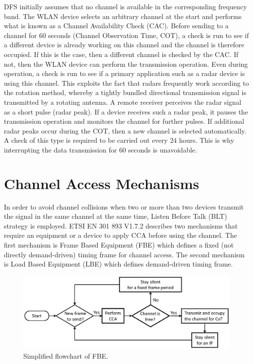DFS initially assumes that no channel is available in the corresponding frequency band. The WLAN device selects an arbitrary channel at the start and performs what is known as a Channel Availability Check (CAC). Before sending to a channel for $60$ seconds (Channel Observation Time, COT), a check is run to see if a different device is already working on this channel and the channel is therefore occupied. If this is the case, then a different channel is checked by the CAC. If not, then the WLAN device can perform the transmission operation. Even during operation, a check is run to see if a primary application such as a radar device is using this channel. This exploits the fact that radars frequently work according to the rotation method, whereby a tightly bundled directional transmission signal is transmitted by a rotating antenna. A remote receiver perceives the radar signal as a short pulse (radar peak). If a device receives such a radar peak, it pauses the transmission operation and monitors the channel for further pulses. If additional radar peaks occur during the COT, then a new channel is selected automatically. A check of this type is required to be carried out every $24$ hours. This is why interrupting the data transmission for $60$ seconds is unavoidable. 


\section{Channel Access Mechanisms}
\label{subsec:ETSI-overview}

In order to avoid channel collisions when two or more than two devices transmit the signal in the same channel at the same time, Listen Before Talk (BLT) strategy is employed. ETSI EN 301 893 V1.7.2 \cite{LBT-ETSI-2014} describes two mechanisms that require an equipment or a device to apply CCA before using the channel. The first mechanism is Frame Based Equipment (FBE) which defines a fixed (not directly demand-driven) timing frame for channel access. The second mechanism is Load Based Equipment (LBE) which defines demand-driven timing frame.

\begin{figure}[!t]
	\centering
	\includegraphics[width=0.9\columnwidth]{figs/FBE-flowchart}
	\caption{Simplified flowchart of FBE.}
	\label{figs:FBE-flowchart}
\end{figure}

